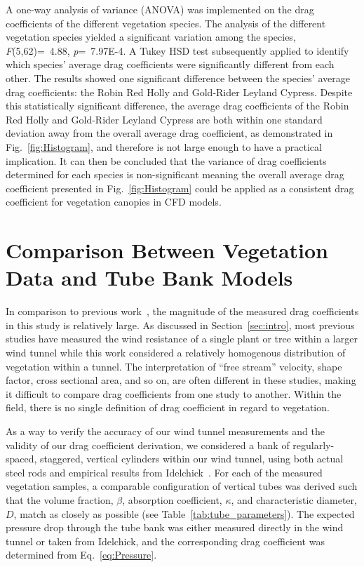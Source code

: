 \documentclass[12pt]{article}
\begin{document}
A one-way analysis of variance (ANOVA) was implemented on the drag coefficients of the different vegetation species. The analysis of the different vegetation species yielded a significant variation among the species, \textit{F}(5,62)=~4.88, \textit{p}=~7.97E-4. A Tukey HSD test subsequently applied to identify which species' average drag coefficients were significantly different from each other. The results showed one significant difference between the species' average drag coefficients: the Robin Red Holly and Gold-Rider Leyland Cypress. Despite this statistically significant difference, the average drag coefficients of the Robin Red Holly and Gold-Rider Leyland Cypress are both within one standard deviation away from the overall average drag coefficient, as demonstrated in Fig.~\ref{fig:Histogram},  and therefore is not large enough to have a practical implication. It can then be concluded that the variance of drag coefficients determined for each species is non-significant meaning the overall average drag coefficient presented in Fig.~\ref{fig:Histogram} could be applied as a consistent drag coefficient for vegetation canopies in CFD models.

\section{Comparison Between Vegetation Data and Tube Bank Models}
\label{sec:comp}

In comparison to previous work~\cite{Cao2012,Jalonen2014,Mayhead1973,Gillies2002,Ishikawa2006}, the magnitude of the measured drag coefficients in this study is relatively large. As discussed in Section~\ref{sec:intro}, most previous studies have measured the wind resistance of a single plant or tree within a larger wind tunnel while this work considered a relatively homogenous distribution of vegetation within a tunnel. The interpretation of ``free stream'' velocity, shape factor, cross sectional area, and so on, are often different in these studies, making it difficult to compare drag coefficients from one study to another. Within the field, there is no single definition of drag coefficient in regard to vegetation.

As a way to verify the accuracy of our wind tunnel measurements and the validity of our drag coefficient derivation, we considered a bank of regularly-spaced, staggered, vertical cylinders within our wind tunnel, using both actual steel rods and empirical results from Idelchick~\cite{Idelchick1994}. For each of the measured vegetation samples, a comparable configuration of vertical tubes was derived such that the volume fraction, $\beta$, absorption coefficient, $\kappa$, and characteristic diameter, $D$, match as closely as possible (see Table~\ref{tab:tube_parameters}). The expected pressure drop through the tube bank was either measured directly in the wind tunnel or taken from Idelchick, and the corresponding drag coefficient was determined from Eq.~\ref{eq:Pressure}.
\end{document}
